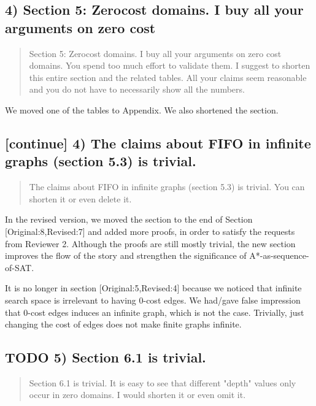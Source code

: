 \documentclass{article}
\begin{document}
\subsection{4) Section 5: Zerocost domains. I buy all your arguments on zero cost}
\label{sec:orgheadline4}

\begin{quote}
Section 5: Zerocost domains. I buy all your arguments on zero cost
domains. You spend too much effort to validate them. I suggest to
shorten this entire section and the related tables. All your claims
seem reasonable and you do not have to necessarily show all the
numbers.
\end{quote}

We moved one of the tables to Appendix. We also shortened the section.

\subsection{[continue] 4)  The claims about FIFO in infinite graphs (section 5.3) is trivial.}
\label{sec:orgheadline5}

\begin{quote}
The claims about FIFO in infinite graphs (section 5.3) is trivial. You can shorten it or even delete it.
\end{quote}

In the revised version, we moved the section to the end of Section [Original:8,Revised:7]
and added more proofs, in order to satisfy the requests from Reviewer 2.
Although the proofs are still mostly trivial, the new section improves the flow of the story
and strengthen the significance of A*-as-sequence-of-SAT.

It is no longer in section [Original:5,Revised:4] because we noticed that
infinite search space is irrelevant to having 0-cost edges.
We had/gave false impression that 0-cost edges induces an infinite graph, which is not the case.
Trivially, just changing the cost of edges does not make finite graphs infinite.

\subsection{{\bfseries\sffamily TODO} 5) Section 6.1 is trivial.}
\label{sec:orgheadline6}

\begin{quote}
Section 6.1 is trivial. It is easy to see that different "depth"
values only occur in zero domains. I would shorten it or even omit it.
\end{quote}
\end{document}
